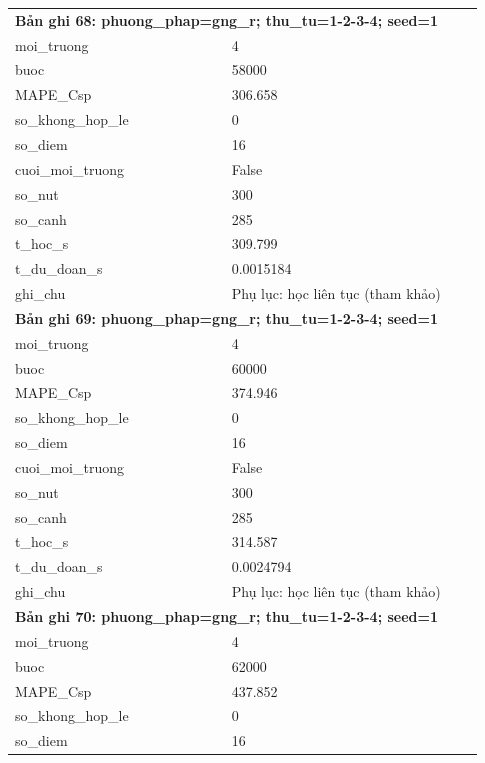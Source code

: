 \begin{longtable}{p{0.43\linewidth}p{0.50\linewidth}}
\midrule
\multicolumn{2}{p{0.95\linewidth}}{\textbf{Bản ghi 68: phuong\_phap=gng\_r; thu\_tu=1-2-3-4; seed=1}} \\
moi\_\allowbreak truong & 4 \\
buoc & 58000 \\
MAPE\_\allowbreak Csp & 306.658 \\
so\_\allowbreak khong\_\allowbreak hop\_\allowbreak le & 0 \\
so\_\allowbreak diem & 16 \\
cuoi\_\allowbreak moi\_\allowbreak truong & False \\
so\_\allowbreak nut & 300 \\
so\_\allowbreak canh & 285 \\
t\_\allowbreak hoc\_\allowbreak s & 309.799 \\
t\_\allowbreak du\_\allowbreak doan\_\allowbreak s & 0.0015184 \\
ghi\_\allowbreak chu & Phụ lục: học liên tục (tham khảo) \\
\midrule
\multicolumn{2}{p{0.95\linewidth}}{\textbf{Bản ghi 69: phuong\_phap=gng\_r; thu\_tu=1-2-3-4; seed=1}} \\
moi\_\allowbreak truong & 4 \\
buoc & 60000 \\
MAPE\_\allowbreak Csp & 374.946 \\
so\_\allowbreak khong\_\allowbreak hop\_\allowbreak le & 0 \\
so\_\allowbreak diem & 16 \\
cuoi\_\allowbreak moi\_\allowbreak truong & False \\
so\_\allowbreak nut & 300 \\
so\_\allowbreak canh & 285 \\
t\_\allowbreak hoc\_\allowbreak s & 314.587 \\
t\_\allowbreak du\_\allowbreak doan\_\allowbreak s & 0.0024794 \\
ghi\_\allowbreak chu & Phụ lục: học liên tục (tham khảo) \\
\midrule
\multicolumn{2}{p{0.95\linewidth}}{\textbf{Bản ghi 70: phuong\_phap=gng\_r; thu\_tu=1-2-3-4; seed=1}} \\
moi\_\allowbreak truong & 4 \\
buoc & 62000 \\
MAPE\_\allowbreak Csp & 437.852 \\
so\_\allowbreak khong\_\allowbreak hop\_\allowbreak le & 0 \\
so\_\allowbreak diem & 16 \\

\end{longtable}
